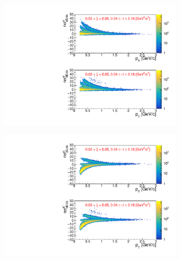 \begin{figure}[h!]
	\label{fig:dEdx_nsigma}
	\centering
	\begin{subfigure}{.49\textwidth}
		\includegraphics[width=\linewidth, page=1]{chapters/chrgSTAR/img/dEdx/fit2019_2dNsigma_0_0.pdf}
	\end{subfigure}
	\begin{subfigure}{.49\textwidth}
		\includegraphics[width=\linewidth, page=1]{chapters/chrgSTAR/img/dEdx/fit2019_2dNsigma_0_1.pdf}
	\end{subfigure}
	\begin{subfigure}{.49\textwidth}

\end{subfigure}
\end{figure}
